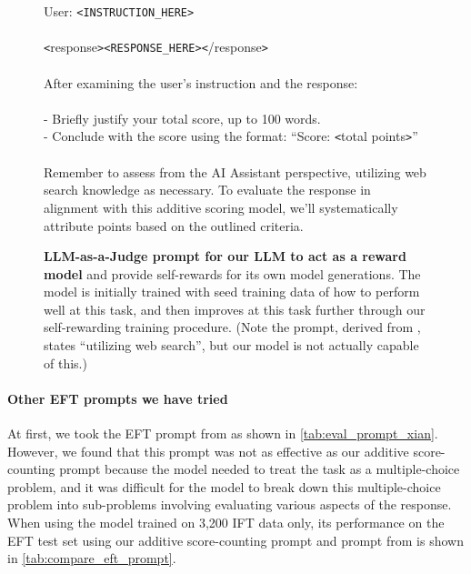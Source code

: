 \documentclass{article}
\begin{document}
\begin{figure}[t]
\begin{tcolorbox}
\\
\\
User: \texttt{\color{red}<INSTRUCTION\_HERE>}\\
\\
\texttt{<}response\texttt{>}\texttt{\color{red}<RESPONSE\_HERE>}\texttt{<}/response\texttt{>}\\
\\
After examining the user's instruction and the response:\\
\\
- Briefly justify your total score, up to 100 words.\\
- Conclude with the score using the format: ``Score: \texttt{<}total points\texttt{>}''\\
\\
Remember to assess from the AI Assistant perspective, utilizing web search knowledge as necessary. To evaluate the response in alignment with this additive scoring model, we'll systematically attribute points based on the outlined criteria.
\end{tcolorbox}
\caption{{\bf LLM-as-a-Judge prompt for our LLM to act as a  reward model} and provide self-rewards for its own model generations. The model is initially trained with seed training data of how to perform well at this task, and then improves at this task further through our self-rewarding  training procedure.  (Note the prompt, derived from  \citet{li2023self}, states ``utilizing web search'', but our model is not actually capable of this.)}
\label{tab:eval_prompt}
\end{figure}
\fi 

\paragraph{Other EFT prompts we have tried}

At first, we took the EFT prompt from \citet{li2023self} as shown in \autoref{tab:eval_prompt_xian}. However, we found that this prompt was not as effective as our additive score-counting prompt because the model needed to treat the task as a multiple-choice problem, and it was difficult for the model to break down this multiple-choice problem into sub-problems involving evaluating various aspects of the response. When using the model trained on 3,200 IFT data only, its performance on the EFT test set using our additive score-counting prompt and prompt from \citet{li2023self} is shown in \autoref{tab:compare_eft_prompt}.
\end{document}
